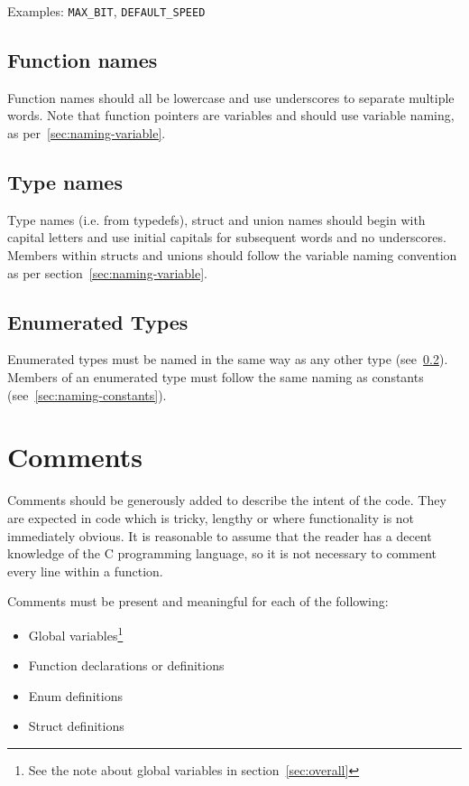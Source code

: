 \documentclass{article}
\begin{document}
Examples: \texttt{MAX\_BIT}, \texttt{DEFAULT\_SPEED}

\subsection{Function names}
Function names should all be lowercase and use underscores to separate multiple words.
Note that function pointers are variables and should use variable naming, as per~\ref{sec:naming-variable}.
\nolinenumbers
{}

\linenumbers

\subsection{Type names}
\label{sec:type-names}
Type names (i.e. from typedefs), struct and union names should begin with capital letters 
and use initial capitals for subsequent words and no underscores. Members within structs and unions should
follow the variable naming convention as per section~\ref{sec:naming-variable}.
\nolinenumbers
{}

\linenumbers

\subsection{Enumerated Types}
Enumerated types must be named in the same way as any other type (see~\ref{sec:type-names}).
Members of an enumerated type must follow the same naming as constants (see~\ref{sec:naming-constants}).

\nolinenumbers
{}

\linenumbers



\section{Comments}
Comments should be generously added to describe the intent of the code.
They are expected in code which is tricky, lengthy or where functionality is not immediately obvious.
It is reasonable to assume that the reader has a decent knowledge of the C programming language, 
so it is not necessary to comment every line within a function.

Comments must be present and meaningful for each of the following:
\begin{itemize}
\itemsep 0em
    \item Global variables\footnote{See the note about global variables in section~\ref{sec:overall}}
    \item Function declarations or definitions
    \item Enum definitions
    \item Struct definitions
\end{itemize}
\end{document}

